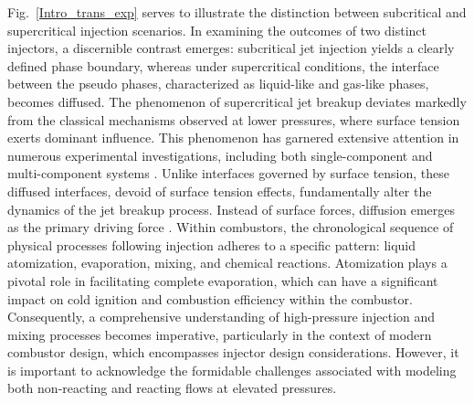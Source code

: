 Fig.~\ref{Intro_trans_exp} serves to illustrate the distinction between subcritical and supercritical injection scenarios. In examining the outcomes of two distinct injectors, a discernible contrast emerges: subcritical jet injection yields a clearly defined phase boundary, whereas under supercritical conditions, the interface between the pseudo phases, characterized as liquid-like and gas-like phases, becomes diffused. The phenomenon of supercritical jet breakup deviates markedly from the classical mechanisms observed at lower pressures, where surface tension exerts dominant influence. This phenomenon has garnered extensive attention in numerous experimental investigations, including both single-component \cite{mayer1998atomization,chehroudi2002visual,candel2006structure,oschwald2006injection,roy2013disintegrating} and multi-component systems \cite{mayer1998atomization,chehroudi2002visual,candel2006structure,oschwald2006injection,roy2013disintegrating}. Unlike interfaces governed by surface tension, these diffused interfaces, devoid of surface tension effects, fundamentally alter the dynamics of the jet breakup process. Instead of surface forces, diffusion emerges as the primary driving force \cite{chehroudi1999initial,smith2004fundamentals}. Within combustors, the chronological sequence of physical processes following injection adheres to a specific pattern: liquid atomization, evaporation, mixing, and chemical reactions. Atomization plays a pivotal role in facilitating complete evaporation, which can have a significant impact on cold ignition and combustion efficiency within the combustor. Consequently, a comprehensive understanding of high-pressure injection and mixing processes becomes imperative, particularly in the context of modern combustor design, which encompasses injector design considerations. However, it is important to acknowledge the formidable challenges associated with modeling both non-reacting and reacting flows at elevated pressures.




